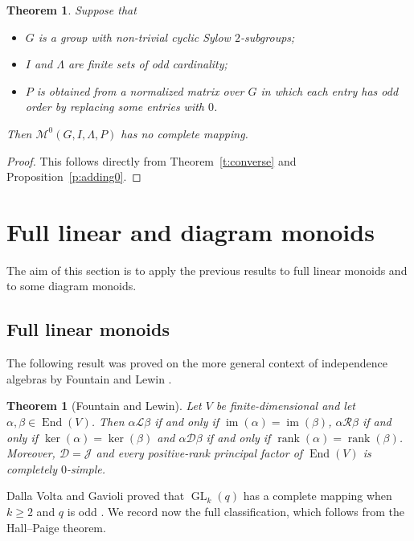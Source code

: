 \documentclass[11pt]{article}
\theoremstyle{plain}
\newtheorem{theorem}{Theorem}[section]
\theoremstyle{remark}
\theoremstyle{definition}
\theoremstyle{plain}
\newtheorem*{quotedtheorem}{Theorem}
\newcommand{\End}{\mathop{\mathrm{End}}}
\DeclareMathOperator{\im}{im}
\DeclareMathOperator{\rank}{rank}
\begin{document}
\begin{theorem}\label{t:converse0}
Suppose that
\begin{itemize}
\item[(a)] $G$ is a group with non-trivial cyclic Sylow $2$-subgroups;
\item[(b)] $I$ and $\Lambda$ are finite sets of odd cardinality;
\item[(c)] $P$ is obtained from a normalized matrix over $G$ in which each
entry has odd order by replacing some entries with $0$.
\end{itemize}
Then
$\mathcal M^0(G,I,\Lambda,P)$
has no complete mapping.
\end{theorem}

\begin{proof}
This follows directly from Theorem~\ref{t:converse} and
Proposition~\ref{p:adding0}.
\end{proof}

\begingroup

\section{Full linear and diagram monoids}
\label{Sec:linear-diagram}

The aim of this section is to apply the previous results to full linear
monoids and to some diagram monoids.

\subsection{Full linear monoids}

The following result was proved on the more general context of independence algebras by Fountain and Lewin
\cite[Propositions~1.3 and~1.4]{FountainLewin}.

\begin{quotedtheorem}[Fountain and Lewin]
Let $V$ be finite-dimensional and let $\alpha,\beta\in\End(V)$. Then
$\alpha\mathrel{\mathcal L}\beta$ if and only if
$\im(\alpha)=\im(\beta)$, $\alpha\mathrel{\mathcal R}\beta$ if and only if
$\ker(\alpha)=\ker(\beta)$ and $\alpha\mathrel{\mathcal D}\beta$ if and
only if $\rank(\alpha)=\rank(\beta)$. Moreover, $\mathcal D=\mathcal J$
and every positive-rank principal factor of $\End(V)$ is completely
$0$-simple.
\end{quotedtheorem}

Dalla Volta and Gavioli proved that $\operatorname{GL}_k(q)$ has a complete mapping when $k\ge2$ and $q$ is odd
\cite[Theorem~3]{DallaVoltaGavioli1997}. We record now the full classification, which follows from the
Hall--Paige theorem.
\end{document}

